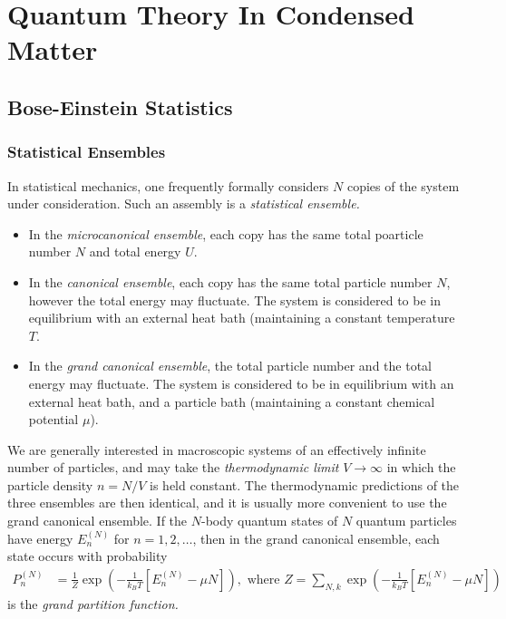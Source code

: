 \documentclass[qo.tex]{subfiles}
\begin{document}
\part{Quantum Theory In Condensed Matter}
\chapter{Bose-Einstein Statistics}
\section{Statistical Ensembles}
In statistical mechanics, one frequently formally considers $N$ copies of the system under consideration. 
Such an assembly is a \emph{statistical ensemble.}
\begin{itemize}
    \item In the \emph{microcanonical ensemble}, each copy has the same total poarticle number $N$ and total energy $U$.
    \item In the \emph{canonical ensemble}, each copy has the same total particle number $N$, however the total energy may fluctuate. 
        The system is considered to be in equilibrium with an external heat bath (maintaining a constant temperature $T$.
    \item In the \emph{grand canonical ensemble}, the total particle number and the total energy may fluctuate. 
        The system is considered to be in equilibrium with an external heat bath, and a particle bath (maintaining a constant chemical potential $\mu$).
\end{itemize}
We are generally interested in macroscopic systems of an effectively infinite number of particles, and may take the \emph{thermodynamic limit} $V\to\infty$ in which the particle density $n=N/V$ is held constant. 
The thermodynamic predictions of the three ensembles are then identical, and it is usually more convenient to use the grand canonical ensemble. 
If the $N$-body quantum states of $N$ quantum particles have energy $E_n^{(N)}$ for $n=1,2,\dots$, then in the grand canonical ensemble, each state occurs with probability
\begin{align}
    P_n^{(N)} &= \frac{1}{Z}\exp\left(-\frac{1}{k_BT}\left[E_n^{(N)}-\mu N\right]\right),
    \text{ where } Z = \sum_{N,k} \exp\left(-\frac{1}{k_BT}\left[E_n^{(N)}-\mu N\right]\right)
\end{align}
is the \emph{grand partition function.}
\end{document}
